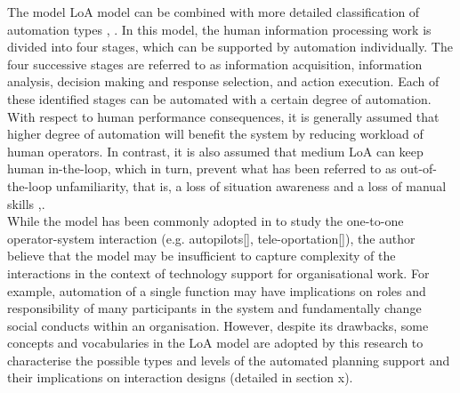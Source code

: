 The model LoA model can be combined with more detailed classification of automation types \cite{Parasuraman2000}, \cite{Manzey2012}. In this model,  the human information processing work is divided into four stages, which can be supported by automation individually. The four successive stages are referred to as information acquisition, information analysis, decision making and response selection, and action execution. Each of these identified stages can be automated with a certain degree of automation. With respect to human performance consequences, it is generally assumed that higher degree of automation will benefit the system by reducing workload of human operators. In contrast, it is also assumed that medium LoA can keep human in-the-loop, which in turn, prevent what has been referred to as out-of-the-loop unfamiliarity, that is, a loss of situation awareness and a loss of manual skills \cite{Kaber1997},\cite{Parasuraman2010}.\\

While the model has been commonly adopted in to study the one-to-one operator-system interaction (e.g. autopilots[], tele-oportation[]), the author believe that the model may be insufficient to capture complexity of the interactions in the context of technology support for organisational work. For example, automation of a single function may have implications on roles and responsibility of many participants in the system and fundamentally change social conducts within an organisation. However, despite its drawbacks, some concepts and vocabularies in the LoA model are adopted by this research to characterise the possible types and levels of the automated planning support and their implications on interaction designs (detailed in section x).\\

